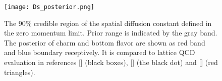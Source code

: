\begin{figure}
\centering
\texttt{[image: Ds\_posterior.png]}
\caption{The 90\% credible region of the spatial diffusion constant defined in the zero momentum limit. Prior range is indicated by the gray band. The posterior of charm and bottom flavor are shown as red band and blue boundary receptively. It is compared to lattice QCD evaluation in references [] (black boxes), [] (the black dot) and [] (red triangles).}
\label{fig:new:posterior-Ds}
\end{figure}
